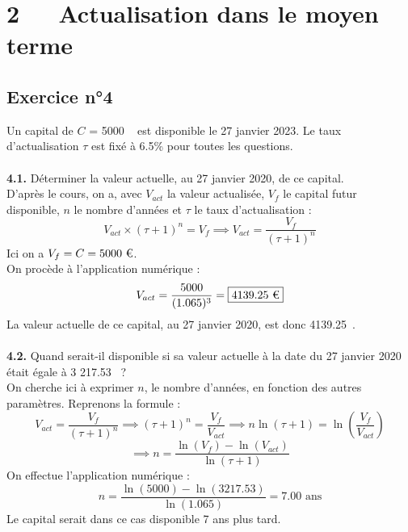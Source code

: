 \documentclass{article}
\begin{document}
\section{2   Actualisation dans le moyen terme}
\subsection{Exercice n°4}
\textcolor{exogris}{
Un capital de $C$ = 5000 \texteuro  est disponible le 27 janvier 2023. Le taux d’actualisation $\tau$ est fixé à 6.5\% pour toutes les questions.
}
\\\\ \textcolor{exogris}{\textbf{4.1.}
Déterminer la valeur actuelle, au 27 janvier 2020, de ce capital.
}
\\%
D'après le cours, on a, avec $V_{act}$ la valeur actualisée, $V_f$ le capital futur disponible, $n$ le nombre d'années et $\tau$ le taux d'actualisation :
$$V_{act} \times(\tau+1)^n= V_f \implies \boxed{V_{act} = \dfrac{V_f}{(\tau+1)^n}}$$
Ici on a $V_f = C = 5000 \text{ \texteuro}$.
%
\\On procède à l'application numérique :
$$V_{act} = \dfrac{5000}{(1.065)^3} = \boxed{4139.25\text{ \texteuro}}$$
La valeur actuelle de ce capital, au 27 janvier 2020, est donc 4139.25 \texteuro.
\\%
\\%
\textcolor{exogris}{\textbf{4.2.}
Quand serait-il disponible si sa valeur actuelle à la date du 27 janvier 2020 était égale à 3 217.53 \texteuro ?
}
\\%
On cherche ici à exprimer $n$, le nombre d'années, en fonction des autres paramètres. Reprenons la formule : 
$$V_{act} = \dfrac{V_f}{(\tau+1)^n} \implies (\tau+1)^n = \dfrac{V_f}{ V_{act}} \implies n \ln(\tau+1) = \ln\left(\dfrac{V_f}{ V_{act}}\right)$$
$$\implies \boxed{n = \dfrac{\ln(V_f) - \ln(V_{act})}{\ln(\tau+1)}}$$
On effectue l'application numérique :
$$n = \dfrac{\ln(5000) - \ln(3217.53)}{\ln(1.065)} = \boxed{7.00 \text{ ans}}$$
Le capital serait dans ce cas disponible 7 ans plus tard.

\end{document}
